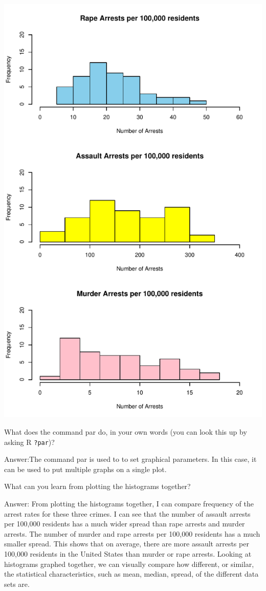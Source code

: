 \documentclass[
]{article}
\begin{document}
\includegraphics{Assignments_files/figure-latex/unnamed-chunk-9-1.pdf}

What does the command par do, in your own words (you can look this up by
asking R \texttt{?par})?

Answer:The command par is used to to set graphical parameters. In this
case, it can be used to put multiple graphs on a single plot.

What can you learn from plotting the histograms together?

Answer: From plotting the histograms together, I can compare frequency
of the arrest rates for these three crimes. I can see that the number of
assault arrests per 100,000 residents has a much wider spread than rape
arrests and murder arrests. The number of murder and rape arrests per
100,000 residents has a much smaller spread. This shows that on average,
there are more assault arrests per 100,000 residents in the United
States than murder or rape arrests. Looking at histograms graphed
together, we can visually compare how different, or similar, the
statistical characteristics, such as mean, median, spread, of the
different data sets are.
\end{document}

